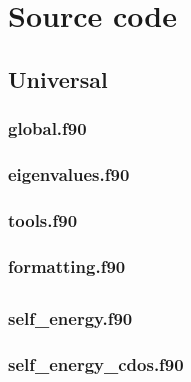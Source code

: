 
\def\path{../../ebmb}

\chapter{Source code}
\label{source code}

\section{Universal}

\subsection{global.f90}



\subsection{eigenvalues.f90}



\subsection{tools.f90}



\subsection{formatting.f90}



\section{}

\subsection{self\_energy.f90}



\subsection{self\_energy\_cdos.f90}

